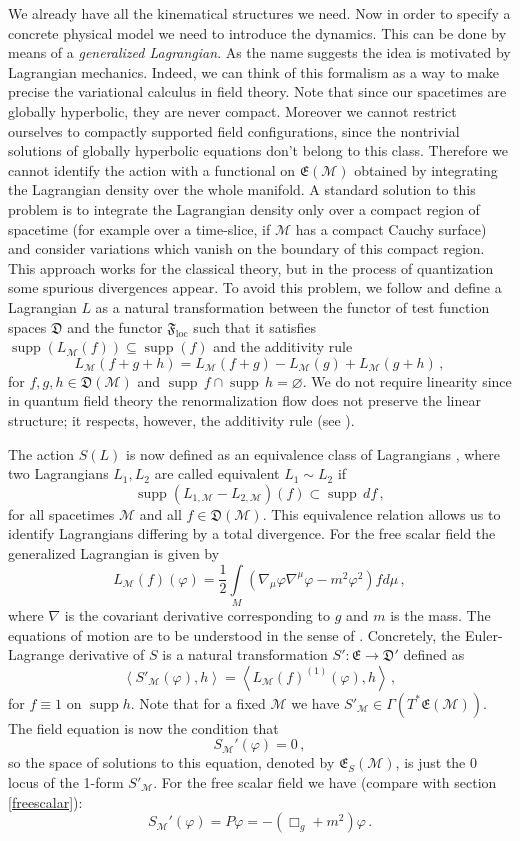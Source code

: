 \documentclass[12pt]{article}
\newcommand{\E}{\mathfrak{E}}
\newcommand{\D}{\mathfrak{D}}
\newcommand{\F}{\mathfrak{F}}
\newcommand{\Mcal}{\mathcal{M}}
\DeclareMathOperator{\supp}{\mathrm{supp}}      %
\newcommand{\loc}{\mathrm{loc}}
\newcommand{\ph}{\varphi}
\newcommand{\1}{\mathds{1}}                         %
\newcommand{\be}{\begin{equation}}
\newcommand{\ee}{\end{equation}}
\begin{document}
{We already have  all the kinematical structures we need. Now in order to specify a concrete physical model we need to introduce the dynamics. This can be done by means of 
a \textit{generalized Lagrangian}. As the name suggests the idea is motivated by Lagrangian mechanics. Indeed, we can think of this formalism as a way to make precise the variational calculus
in field theory. Note that since our spacetimes are globally hyperbolic, they are never compact. Moreover we cannot restrict ourselves to compactly supported field configurations, since the nontrivial solutions of globally hyperbolic equations don't belong to this class. Therefore we cannot identify the action with a functional on $\E(\Mcal)$ obtained 
by integrating the Lagrangian density over the whole manifold. A standard solution to this problem is to integrate the  Lagrangian density only over a compact region of spacetime (for example over a time-slice, if $\Mcal$ has a compact Cauchy surface) and consider variations which vanish on the boundary of this compact region. This approach works for the classical theory, but in the process of quantization some spurious divergences appear. To avoid this problem, we follow \cite{BDF} and define a Lagrangian $L$ as a natural transformation between the functor of test function spaces $\D$ and the functor $\F_\loc$ such that it satisfies $\supp(L_\Mcal(f))\subseteq \supp(f)$ and the additivity rule 
\[
L_\Mcal(f+g+h)=L_\Mcal(f+g)-L_\Mcal(g)+L_\Mcal(g+h)\,,
\]
for $f,g,h\in\D(\Mcal)$ and $\supp\,f\cap\supp\,h=\varnothing$. We do not require linearity since in quantum field theory the renormalization flow does not preserve the linear structure; it respects, however, the additivity rule (see \cite{BDF}).

The action $S(L)$ is now defined as an equivalence class of Lagrangians  \cite{BDF}, where two Lagrangians $L_1,L_2$ are called equivalent $L_1\sim L_2$  if
\be\label{equ}
\supp (L_{1,\Mcal}-L_{2,\Mcal})(f)\subset\supp\, df\,, 
\ee
for all spacetimes $\Mcal$ and all $f\in\D(\Mcal)$. 
This equivalence relation allows us to identify Lagrangians differing by a total divergence.  For the free scalar field the generalized Lagrangian is given by
\be\label{Lscalar}
L_\Mcal(f)(\ph)=\frac{1}{2}\int\limits_M (\nabla_\mu\ph\nabla^\mu\ph-m^2\ph^2)fd\mu\,,
\ee
where $\nabla$ is the covariant derivative corresponding to $g$ and $m$ is the mass. The equations of motion are to be understood in the sense of \cite{BDF}. Concretely, the Euler-Lagrange derivative of $S$ is a natural transformation $S':\E\to\D'$ defined as
\be\label{ELd}
\left<S'_\Mcal(\ph),h\right>=\left<L_\Mcal(f)^{(1)}(\ph),h\right>\,,
 \ee
for $f\equiv 1$ on $\supp h$. Note that for a fixed $\Mcal$ we have $S'_{\Mcal}\in\Gamma(T^*\E(\Mcal))$. The field equation is now the condition that
\be
 S_\Mcal'(\ph)=0\label{eom}\,,
\ee
so the space of solutions to this equation, denoted by $\E_S(\Mcal)$, is just the 0 locus of the 1-form $S'_{\Mcal}$. For the free scalar field we have (compare with section \eqref{freescalar}):
\[
 S_\Mcal'(\ph)=P\ph=-(\Box_g+m^2)\ph\,.
\]
 
}
\end{document}

